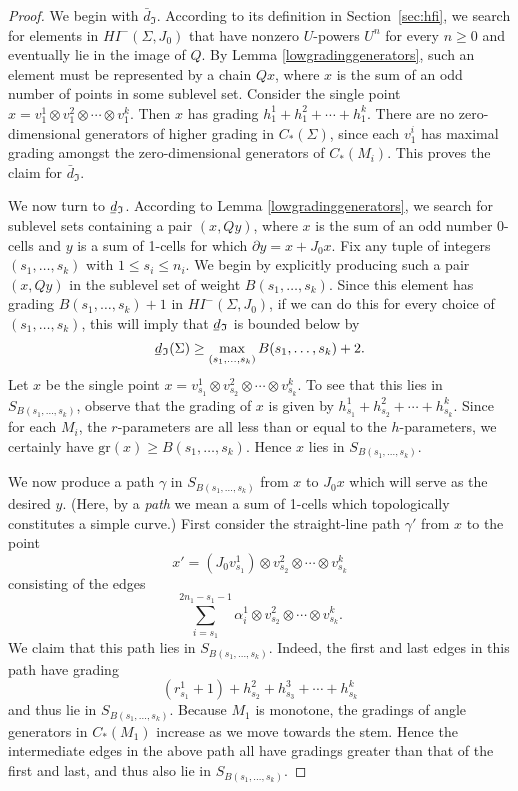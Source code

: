 \documentclass[11 pt]{amsart}
\theoremstyle{remark}
\def\gr{\mathrm{gr}}
\newcommand{\bunderline}[1]{\underline{#1\mkern-2mu}\mkern2mu }
\def\du {\bar{d}}
\def\dl {\bunderline{d}}
\def\HIm{\mathit{HI}^-}
\def\Inv{\mathfrak{I}}
\begin{document}
\begin{proof}
We begin with $\du_{\Inv}$. According to its definition in Section~\ref{sec:hfi}, we search for elements in $\HIm(\Sigma, J_0)$ that have nonzero $U$-powers $U^n$ for every $n \geq 0$ and eventually lie in the image of $Q$. By Lemma \ref{lowgradinggenerators}, such an element must be represented by a chain $Qx$, where $x$ is the sum of an odd number of points in some sublevel set. Consider the single point $x = v_1^1 \otimes v_1^2 \otimes \cdots \otimes v_1^k$. Then $x$ has grading $h_1^1 + h_1^2 + \cdots + h_1^k$. There are no zero-dimensional generators of higher grading in $C_*(\Sigma)$, since each $v_1^i$ has maximal grading amongst the zero-dimensional generators of $C_*(M_i)$. This proves the claim for $\du_{\Inv}$. 

We now turn to $\dl_{\Inv}$. According to Lemma \ref{lowgradinggenerators}, we search for sublevel sets containing a pair $(x, Qy)$, where $x$ is the sum of an odd number 0-cells and $y$ is a sum of 1-cells for which $\partial y = x + J_0x$. Fix any tuple of integers $(s_1, \ldots, s_k)$ with $1 \leq s_i \leq n_i$. We begin by explicitly producing such a pair $(x, Qy)$ in the sublevel set of weight $B(s_1, \ldots, s_k)$. Since this element has grading $B(s_1, \ldots, s_k) + 1$ in $\HIm(\Sigma, J_0)$, if we can do this for every choice of $(s_1, \ldots, s_k)$, this will imply that $\dl_{\Inv}$ is bounded below by
\[
\dl_{\Inv}(\Sigma) \geq \max_{(s_1, \ldots, s_k)} B(s_1, \ldots, s_k) + 2.
\]
Let $x$ be the single point $x = v^1_{s_1} \otimes v^2_{s_2} \otimes \cdots \otimes v^k_{s_k}$. To see that this lies in $S_{B(s_1, \ldots, s_k)}$, observe that the grading of $x$ is given by $h^1_{s_1} + h^2_{s_2} + \cdots + h^k_{s_k}$. Since for each $M_i$, the $r$-parameters are all less than or equal to the $h$-parameters, we certainly have $\gr(x) \geq B(s_1, \ldots, s_k)$. Hence $x$ lies in $S_{B(s_1, \ldots, s_k)}$.

We now produce a path $\gamma$ in $S_{B(s_1, \ldots, s_k)}$ from $x$ to $J_0x$ which will serve as the desired $y$. (Here, by a \textit{path} we mean a sum of 1-cells which topologically constitutes a simple curve.) First consider the straight-line path $\gamma'$ from $x$ to the point
\[
x' = (J_0v^1_{s_1}) \otimes v^2_{s_2} \otimes \cdots \otimes v^k_{s_k}
\]
consisting of the edges 
\[
\sum_{i = s_1}^{2n_1-s_1-1} \alpha^1_{i} \otimes v^2_{s_2} \otimes \cdots \otimes v^k_{s_k}.
\]
We claim that this path lies in $S_{B(s_1, \ldots, s_k)}$. Indeed, the first and last edges in this path have grading
\[
(r_{s_1}^1 + 1) + h_{s_2}^2 + h_{s_3}^3 + \cdots + h_{s_k}^k
\] 
and thus lie in $S_{B(s_1, \ldots, s_k)}$. Because $M_1$ is monotone, the gradings of angle generators in $C_*(M_1)$ increase as we move towards the stem. Hence the intermediate edges in the above path all have gradings greater than that of the first and last, and thus also lie in $S_{B(s_1, \ldots, s_k)}$. 


\end{proof}
\end{document}

